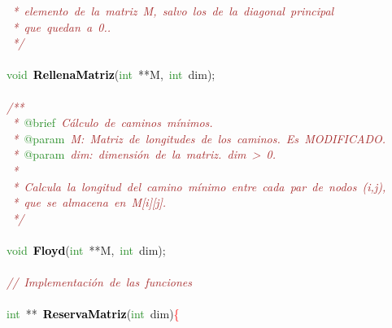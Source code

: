 \mbox{}\textit{\textcolor{Brown}{\ *\ elemento\ de\ la\ matriz\ M,\ salvo\ los\ de\ la\ diagonal\ principal}} \\
\mbox{}\textit{\textcolor{Brown}{\ *\ que\ quedan\ a\ 0..}} \\
\mbox{}\textit{\textcolor{Brown}{\ */}} \\
\mbox{} \\
\mbox{}\textcolor{ForestGreen}{void}\ \textbf{\textcolor{Black}{RellenaMatriz}}\textcolor{BrickRed}{(}\textcolor{ForestGreen}{int}\ \textcolor{BrickRed}{**}M\textcolor{BrickRed}{,}\ \textcolor{ForestGreen}{int}\ dim\textcolor{BrickRed}{);} \\
\mbox{}\  \\
\mbox{}\textit{\textcolor{Brown}{/**}} \\
\mbox{}\textit{\textcolor{Brown}{\ *\ }}\textcolor{ForestGreen}{@brief}\textit{\textcolor{Brown}{\ Cálculo\ de\ caminos\ mínimos.}} \\
\mbox{}\textit{\textcolor{Brown}{\ *\ }}\textcolor{ForestGreen}{@param}\textit{\textcolor{Brown}{\ M:\ Matriz\ de\ longitudes\ de\ los\ caminos.\ Es\ MODIFICADO.}} \\
\mbox{}\textit{\textcolor{Brown}{\ *\ }}\textcolor{ForestGreen}{@param}\textit{\textcolor{Brown}{\ dim:\ dimensión\ de\ la\ matriz.\ dim\ \textgreater{}\ 0.}} \\
\mbox{}\textit{\textcolor{Brown}{\ *\ }} \\
\mbox{}\textit{\textcolor{Brown}{\ *\ Calcula\ la\ longitud\ del\ camino\ mínimo\ entre\ cada\ par\ de\ nodos\ (i,j),}} \\
\mbox{}\textit{\textcolor{Brown}{\ *\ que\ se\ almacena\ en\ M[i][j].}} \\
\mbox{}\textit{\textcolor{Brown}{\ */}} \\
\mbox{} \\
\mbox{}\textcolor{ForestGreen}{void}\ \textbf{\textcolor{Black}{Floyd}}\textcolor{BrickRed}{(}\textcolor{ForestGreen}{int}\ \textcolor{BrickRed}{**}M\textcolor{BrickRed}{,}\ \textcolor{ForestGreen}{int}\ dim\textcolor{BrickRed}{);} \\
\mbox{} \\
\mbox{}\textit{\textcolor{Brown}{//\ Implementación\ de\ las\ funciones}} \\
\mbox{} \\
\mbox{}\textcolor{ForestGreen}{int}\ \textcolor{BrickRed}{**}\ \textbf{\textcolor{Black}{ReservaMatriz}}\textcolor{BrickRed}{(}\textcolor{ForestGreen}{int}\ dim\textcolor{BrickRed}{)}\textcolor{Red}{\{} \\

